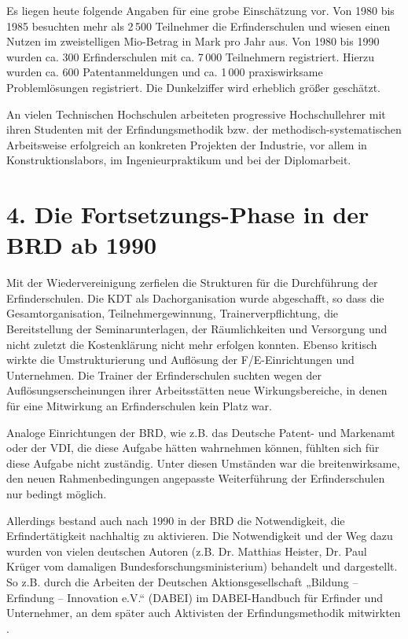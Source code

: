\documentclass[11pt,a4paper]{article}
\begin{document}
Es liegen heute folgende Angaben für eine grobe Einschätzung vor. Von 1980 bis
1985 besuchten mehr als 2\,500 Teilnehmer die Erfinderschulen und wiesen einen
Nutzen im zweistelligen Mio-Betrag in Mark pro Jahr aus. Von 1980 bis 1990
wurden ca. 300 Erfinderschulen mit ca. 7\,000 Teilnehmern registriert. Hierzu
wurden ca. 600 Patentanmeldungen und ca. 1\,000 praxiswirksame Problemlösungen
registriert. Die Dunkelziffer wird erheblich größer geschätzt.

An vielen Technischen Hochschulen arbeiteten progressive Hochschullehrer mit
ihren Studenten mit der Erfindungsmethodik bzw. der methodisch-systematischen
Arbeitsweise erfolgreich an konkreten Projekten der Industrie, vor allem in
Konstruktionslabors, im Ingenieurpraktikum und bei der Diplomarbeit.

\section*{4. Die Fortsetzungs-Phase in der BRD ab 1990}

Mit der Wiedervereinigung zerfielen die Strukturen für die Durchführung der
Erfinderschulen. Die KDT als Dachorganisation wurde abgeschafft, so dass die
Gesamtorganisation, Teilnehmergewinnung, Trainerverpflichtung, die
Bereitstellung der Seminarunterlagen, der Räumlich\-keiten und Versorgung und
nicht zuletzt die Kostenklärung nicht mehr erfolgen konnten. Ebenso kritisch
wirkte die Umstrukturierung und Auflösung der F/E-Einrichtungen und
Unternehmen.  Die Trainer der Erfinderschulen suchten wegen der
Auflösungserscheinungen ihrer Arbeitsstätten neue Wirkungsbereiche, in denen
für eine Mitwirkung an Erfinderschulen kein Platz war.

Analoge Einrichtungen der BRD, wie z.B. das Deutsche Patent- und Markenamt
oder der VDI, die diese Aufgabe hätten wahrnehmen können, fühlten sich für
diese Aufgabe nicht zuständig. Unter diesen Umständen war die breitenwirksame,
den neuen Rahmenbedingungen angepasste Weiterführung der Erfinderschulen nur
bedingt möglich.

Allerdings bestand auch nach 1990 in der BRD die Notwendigkeit, die
Erfindertätigkeit nachhaltig zu aktivieren. Die Notwendigkeit und der Weg dazu
wurden von vielen deutschen Autoren (z.B. Dr. Matthias Heister, Dr. Paul
Krüger vom damaligen Bundesforschungsministerium) behandelt und dargestellt.
So z.B. durch die Arbeiten der Deutschen Aktionsgesellschaft „Bildung –
Erfindung – Innovation e.V.“ (DABEI) im DABEI-Handbuch für Erfinder und
Unternehmer, an dem später auch Aktivisten der Erfindungsmethodik mitwirkten
\cite{15}.
\end{document}
